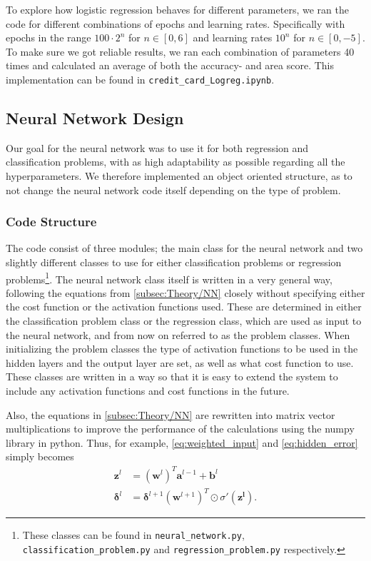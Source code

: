 \documentclass[10pt, twocolumn]{article}
\begin{document}
To explore how logistic regression behaves for different parameters, we ran the code for different combinations of epochs and learning rates. Specifically with epochs in the range $100\cdot2^n$ for $n \in [0,6]$ and learning rates $10^n$ for $n\in[0,-5]$. To make sure we got reliable results, we ran each combination of parameters 40 times and calculated an average of both the accuracy- and area score. This implementation can be found in \texttt{credit\_card\_Logreg.ipynb}.


\subsection{Neural Network Design}
\label{subsubsec:Method/Building_NN}
Our goal for the neural network was to use it for both regression and classification problems, with as high adaptability as possible regarding all the hyperparameters. We therefore implemented an object oriented structure, as to not change the neural network code itself depending on the type of problem.

\subsubsection{Code Structure}
\label{subsubsec:Method/NN/code_structure}
The code consist of three modules; the main class for the neural network and two slightly different classes to use for either classification problems or regression problems\footnote{These classes can be found in \texttt{neural\_network.py}, \texttt{classification\_problem.py} and \texttt{regression\_problem.py} respectively.}.
The neural network class itself is written in a very general way, following the equations from \cref{subsec:Theory/NN} closely without specifying either the cost function or the activation functions used. These are determined in either the classification problem class or the regression class, which are used as input to the neural network, and from now on referred to as the problem classes. When initializing the problem classes the type of activation functions to be used in the hidden layers and the output layer are set, as well as what cost function to use. These classes are written in a way so that it is easy to extend the system to include any activation functions and cost functions in the future.

Also, the equations in \cref{subsec:Theory/NN} are rewritten into matrix vector multiplications to improve the performance of the calculations using the numpy library in python. Thus, for example, \cref{eq:weighted_input} and \cref{eq:hidden_error} simply becomes
\begin{align}
    \bm{z}^l &= \left(\bm{w}^l\right)^T\bm{a}^{l-1} + \bm{b}^l \label{eq:weighted_input_matrix}
    \\
    \bm{\delta}^l &= \bm{\delta}^{l+1}\left(\bm{w}^{l+1}\right)^T \odot \sigma\prime(\bm{z^l}).
\end{align}
\end{document}
